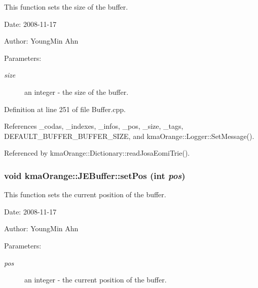 This function sets the size of the buffer. 

\begin{Desc}
\item[Date:]2008-11-17 \end{Desc}
\begin{Desc}
\item[Author:]YoungMin Ahn \end{Desc}
\begin{Desc}
\item[Parameters:]
\begin{description}
\item[{\em size}]an integer - the size of the buffer. \end{description}
\end{Desc}


Definition at line 251 of file Buffer.cpp.

References \_\-codas, \_\-indexes, \_\-infos, \_\-pos, \_\-size, \_\-tags, DEFAULT\_\-BUFFER\_\-BUFFER\_\-SIZE, and kmaOrange::Logger::SetMessage().

Referenced by kmaOrange::Dictionary::readJosaEomiTrie().\hypertarget{classkmaOrange_1_1JEBuffer_0992fe0c2cab27f8e5055112cdcb163c}{
\subsubsection[{setPos}]{\setlength{\rightskip}{0pt plus 5cm}void kmaOrange::JEBuffer::setPos (int {\em pos})}}
\label{classkmaOrange_1_1JEBuffer_0992fe0c2cab27f8e5055112cdcb163c}


This function sets the current position of the buffer. 

\begin{Desc}
\item[Date:]2008-11-17 \end{Desc}
\begin{Desc}
\item[Author:]YoungMin Ahn \end{Desc}
\begin{Desc}
\item[Parameters:]
\begin{description}
\item[{\em pos}]an integer - the current position of the buffer. \end{description}
\end{Desc}


